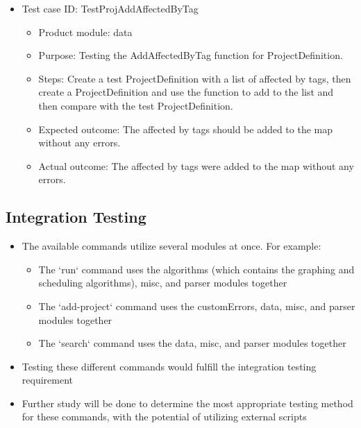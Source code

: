 \documentclass[11pt]{article}
\begin{document}
\begin{itemize}
    \item Test case ID: TestProjAddAffectedByTag
    \begin{itemize}
        \item Product module: data
        \item Purpose: Testing the AddAffectedByTag function for ProjectDefinition.
        \item Steps: Create a test ProjectDefinition with a list of affected by tags, then create a ProjectDefinition and use the function to add to the list and then compare with the test ProjectDefinition.
        \item Expected outcome: The affected by tags should be added to the map without any errors.
        \item Actual outcome: The affected by tags were added to the map without any errors.
    \end{itemize}
\end{itemize}

\subsection{Integration Testing}
\begin{itemize}
    \item The available commands utilize several modules at once. For example:
    \begin{itemize}
        \item The `run` command uses the algorithms (which contains the graphing and scheduling algorithms), misc, and parser modules together
        \item The `add-project` command uses the customErrors, data, misc, and parser modules together
        \item The `search` command uses the data, misc, and parser modules together
    \end{itemize}
    \item Testing these different commands would fulfill the integration testing requirement
    \item Further study will be done to determine the most appropriate testing method for these commands, with the potential of utilizing external scripts
\end{itemize}
\end{document}
